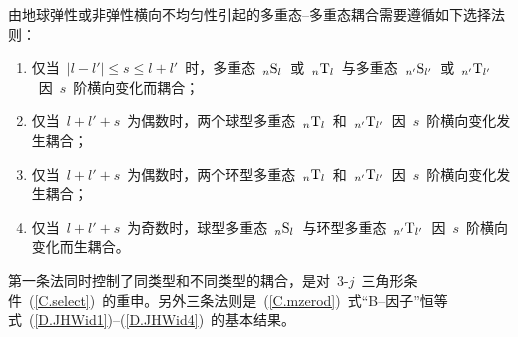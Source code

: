 由地球弹性或非弹性横向不均匀性引起的多重态--多重态耦合需要遵循如下选择法则：
%
%
\begin{enumerate}
\item 

仅当~$|l-l'|\leq s\leq l+l'$~时，多重态~${}_n{\rm S}_l$~或~${}_n{\rm T}_l$~与多重态~${}_{n'}{\rm S}_{l'}$~或~${}_{n'}{\rm T}_{l'}$~因~$s$~阶横向变化而耦合；
\item 

仅当~$l+l'+s$~为偶数时，两个球型多重态~${}_n{\rm T}_l$~和~${}_{n'}{\rm T}_{l'}$~因~$s$~阶横向变化发生耦合；
\item 

仅当~$l+l'+s$~为偶数时，两个环型多重态~${}_n{\rm T}_l$~和~${}_{n'}{\rm T}_{l'}$~因~$s$~阶横向变化发生耦合；
\item 

仅当~$l+l'+s$~为奇数时，球型多重态~${}_n{\rm S}_l$~与环型多重态~${}_{n'}{\rm T}_{l'}$~因~$s$~阶横向变化而生耦合。
\end{enumerate}

第一条法同时控制了同类型和不同类型的耦合，是对~3-$j$~三角形条件~(\ref{C.select})~的重申。另外三条法则是~(\ref{C.mzerod})~式“B--因子”恒等式~(\ref{D.JHWid1})--(\ref{D.JHWid4})~的基本结果。
%

